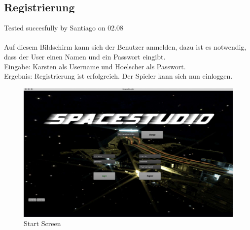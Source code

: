 \documentclass[12pt]{article}
\begin{document}
\subsection{Registrierung}
Tested succesfully by Santiago on 02.08\\\\
Auf diesem Bildschirm kann sich der Benutzer anmelden, dazu ist es notwendig, dass der User einen Namen und ein Passwort eingibt.\\
Eingabe: Karsten als Username und Hoelscher als Passwort.\\
Ergebnis: Registrierung ist erfolgreich. Der Spieler kann sich nun einloggen.\\
\begin{figure}[htp]
\centering
\includegraphics[scale=0.4]{TestProtocolBilder/startScreen.jpg}
\caption{Start Screen}
\end{figure}

\newpage
\end{document}
